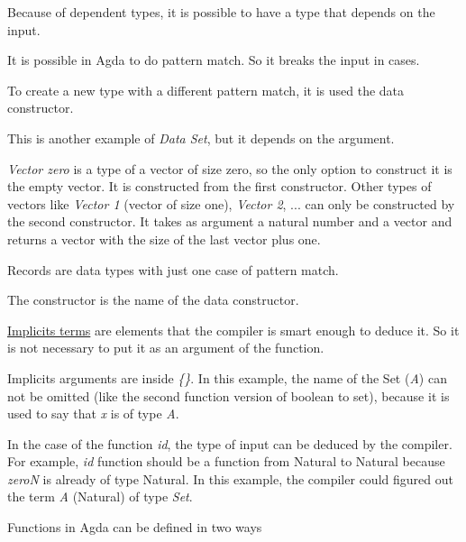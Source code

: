   Because of dependent types, it is possible to have a type that depends on the input.


  It is possible in Agda to do pattern match.
  So it breaks the input in cases.


  To create a new type with a different pattern match, it is used the data constructor.


  This is another example of \emph{Data Set}, but it depends on the argument.


  \emph{Vector zero} is a type of a vector of size zero, so the only option to construct it is the empty vector.
  It is constructed from the first constructor.
  Other types of vectors like \emph{Vector 1} (vector of size one), \emph{Vector 2}, ... can only be constructed by
  the second constructor.
  It takes as argument a natural number and a vector and returns a vector with the size of the last vector
  plus one.

  Records are data types with just one case of pattern match.


  The constructor is the name of the data constructor.

  \hyperref[id]{Implicits terms} are elements that the compiler is smart enough to deduce it.
  So it is not necessary to put it as an argument of the function.


  Implicits arguments are inside \emph{\{\}}.
  In this example, the name of the Set (\emph{A}) can not be omitted
  (like the second function version of boolean to set),
  because it is used to say that \emph{x} is of type \emph{A}.

  In the case of the function \emph{id}, the type of input can be deduced by the compiler.
  For example, \emph{id} function should be a function from Natural to Natural because
  \emph{zeroN} is already of type Natural.
  In this example, the compiler could figured out the term \emph{A} (Natural) of type \emph{Set}.


  Functions in Agda can be defined in two ways

